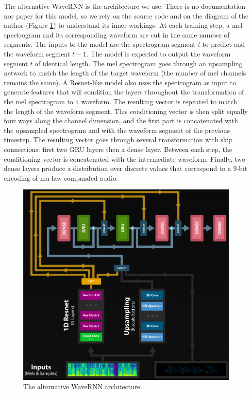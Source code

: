 \documentclass[a4paper, oneside, 12pt, english]{article}
\begin{document}
The alternative WaveRNN is the architecture we use. There is no documentation nor paper for this model, so we rely on the source code and on the diagram of the author (Figure \ref{fatchord_wavernn}) to understand its inner workings. At each training step, a mel spectrogram and its corresponding waveform are cut in the same number of segments. The inputs to the model are the spectrogram segment $t$ to predict and the waveform segment $t - 1$. The model is expected to output the waveform segment $t$ of identical length. The mel spectrogram goes through an upsampling network to match the length of the target waveform (the number of mel channels remains the same). A Resnet-like model also uses the spectrogram as input to generate features that will condition the layers throughout the transformation of the mel spectrogram to a waveform. The resulting vector is repeated to match the length of the waveform segment. This conditioning vector is then split equally four ways along the channel dimension, and the first part is concatenated with the upsampled spectrogram and with the waveform segment of the previous timestep. The resulting vector goes through several transformation with skip connections: first two GRU layers then a dense layer. Between each step, the conditioning vector is concatenated with the intermediate waveform. Finally, two dense layers produce a distribution over discrete values that correspond to a 9-bit encoding of mu-law companded audio.

\begin{figure}[h]
	\centering
	\includegraphics[width=0.75\linewidth]{images/fatchord_wavernn.png}
	\caption{The alternative WaveRNN architecture.}
	\label{fatchord_wavernn}
\end{figure}
\end{document}
